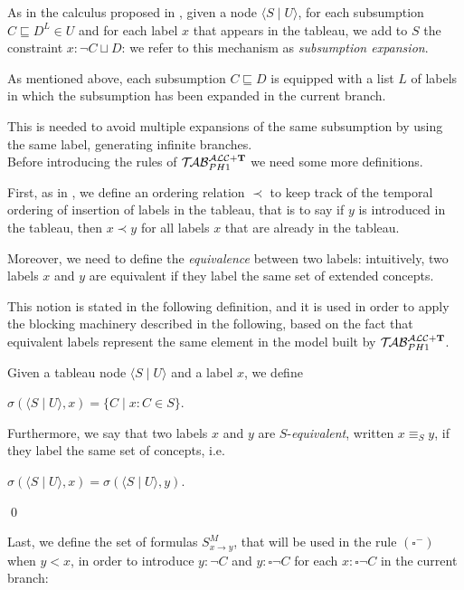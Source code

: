 \documentclass[a4paper, 11pt, oneside]{duthesis}
\newcommand{\tip}{{\bf T}}
\newcommand{\unioneq}{\sqcup}
\newcommand{\nott} {\lnot}
\newcommand{\tc} {\mid}
\newcommand{\imp} {\rightarrow}
\newcommand{\bbox}{\square}
\newcommand{\sx} {\langle}
\newcommand{\dx} {\rangle}
\newcommand{\Gammam}[2]{S^{M}_{#1 \imp #2}}
\newcommand{\primo}{\mathrel{{\mathcal{T}\!\mathcal{AB}}}_{PH 1}^{\mathcal{ALC}+\mbox{\scriptsize $\tip$}}}
\newenvironment{definition}
{\begin{defi} \rm}{\qed \end{defi}}
\newenvironment{definition}
{\begin{defi} \rm}{\qed \end{defi}}
\newtheorem{definition}{Definition}
\newcounter{posu}
\newtheorem{definition}[posu]{Definition}
\begin{document}
As in the calculus proposed in \cite{FI09}, given a node $\sx S \tc U \dx$, for each subsumption $C \sqsubseteq D^L \in U$ and for each label $x$ that appears in the tableau, we add to $S$ the constraint $x: \nott C \unioneq D$: we refer to this mechanism as \emph{subsumption expansion}.

As mentioned above, each subsumption $C \sqsubseteq D$ is equipped with a list $L$ of labels in which the subsumption has been expanded in the current branch.

This is needed to avoid multiple expansions of the same subsumption by using the same label, generating infinite branches.\\


Before introducing the rules of $\primo$ we need some more definitions.

First, as in \cite{buchheit-et-al}, we define an ordering relation $\prec$ to keep track of the temporal ordering of insertion of labels in the tableau, that is to say if $y$ is introduced in the tableau, then $x \prec y$ for all labels $x$ that are already in the tableau.

Moreover, we need to define the \emph{equivalence} between two labels: intuitively, two labels $x$ and $y$ are equivalent if they label the same set of extended concepts.

This notion is stated in the following definition, and it is used in order to apply the blocking machinery described in the following, based on the fact that equivalent labels represent the same element in the model built by $\primo$.

\begin{definition}
Given a tableau node $\sx S \tc U \dx$ and a label $x$, we define
\begin{center}$\sigma(\sx S \tc U \dx,x)=\{C \tc x: C \in S\}.$\end{center}

\noindent Furthermore, we say that two labels $x$ and $y$ are $S$-\emph{equivalent}, written $x \equiv_S y$, if they label the same set of concepts, i.e.

\begin{center}$\sigma(\sx S \tc U \dx,x)=\sigma(\sx S \tc U \dx,y).$\end{center}
\end{definition}

\noindent Last, we define the set of formulas $\Gammam{x}{y}$, that will be used in the rule $(\bbox^-)$ when $y<x$, in order to introduce $y: \nott C$ and $y: \bbox \nott C$ for each $x: \bbox \nott C$ in the current branch:
\end{document}
